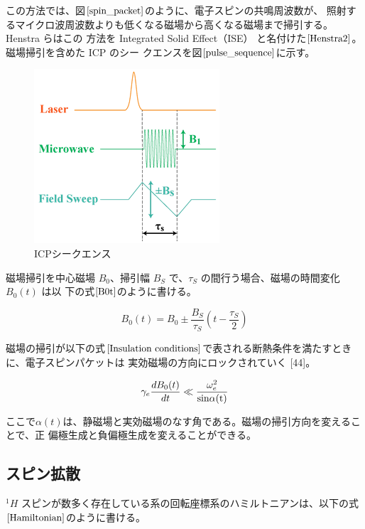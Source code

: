  この方法では、図$\ref{spin_packet}$のように、電子スピンの共鳴周波数が、
 照射するマイクロ波周波数よりも低くなる磁場から高くなる磁場まで掃引する。Henstra らはこの
 方法を Integrated Solid Effect（ISE） と名付けた$\cite{Henstra2}$。磁場掃引を含めた ICP のシー
 クエンスを図$\ref{pulse_sequence}$に示す。

 \begin{figure}[ht]
  \centering
  \includegraphics[keepaspectratio, scale=1.5]
       {./chap2/fig/pulse_sequence.png}
  \caption{ICPシークエンス}
  \label{pulse_sequence}
 \end{figure}

 磁場掃引を中心磁場 $B_0$、掃引幅 $B_S$ で、$\tau_S$ の間行う場合、磁場の時間変化 $B_0(t)$ は以
 下の式$\ref{B0t}$のように書ける。

\begin{equation}
  B_0(t)= B_0 \pm \frac{B_S}{\tau_S}(t-\frac{\tau_S}{2})
  \label{B0t}
\end{equation} 

磁場の掃引が以下の式$\ref{Insulation conditions}$で表される断熱条件を満たすときに、電子スピンパケットは
実効磁場の方向にロックされていく [44]。

\begin{equation}
  \gamma_e\frac{dB_0(t)}{dt} \ll \frac{\omega^2_e}{\rm{sin}\alpha(t)}
  \label{Insulation conditions}
\end{equation}

ここで$\alpha (t)$は、静磁場と実効磁場のなす角である。磁場の掃引方向を変えることで、正
偏極生成と負偏極生成を変えることができる。

\subsection{スピン拡散}
${}^1H$ スピンが数多く存在している系の回転座標系のハミルトニアンは、以下の式$\ref{Hamiltonian}$のように書ける。

